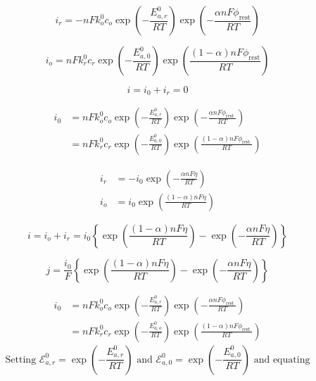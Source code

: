 \documentclass[lettersize,journal]{IEEEtran}
\begin{document}
\begin{equation}
i_{r}=-n F k_{o}^{0} c_{o} \exp \left(-\frac{E_{a, r}^{0}}{R T}\right) \exp \left(-\frac{\alpha n F \phi_{\mathrm{rest}}}{R T}\right)
\end{equation}

\begin{equation}
i_{o}=n F k_{r}^{0} c_{r} \exp \left(-\frac{E_{a, 0}^{0}}{R T}\right) \exp \left(\frac{(1-\alpha) n F \phi_{\mathrm{rest}}}{R T}\right)
\end{equation}

\begin{equation}
i=i_{0}+i_{r}=0
\end{equation}

\begin{equation}
\begin{aligned}
i_{0} &=n F k_{o}^{0} c_{o} \exp \left(-\frac{E_{a, r}^{0}}{R T}\right) \exp \left(-\frac{\alpha n F \phi_{\text {rest }}}{R T}\right) \\
&=n F k_{r}^{0} c_{r} \exp \left(-\frac{E_{a, 0}^{0}}{R T}\right) \exp \left(\frac{(1-\alpha) n F \phi_{\text {rest }}}{R T}\right)
\end{aligned}
\end{equation}

\begin{equation}
\begin{aligned}
i_{r} &=-i_{0} \exp \left(-\frac{\alpha n F \eta}{R T}\right) \\
i_{o} &=i_{0} \exp \left(\frac{(1-\alpha) n F \eta}{R T}\right)
\end{aligned}
\end{equation}

\begin{equation}
i=i_{o}+i_{r}=i_{0}\left\{\exp \left(\frac{(1-\alpha) n F \eta}{R T}\right)-\exp \left(-\frac{\alpha n F \eta}{R T}\right)\right\}
\end{equation}


\begin{equation}
j=\frac{i_{0}}{F}\left\{\exp \left(\frac{(1-\alpha) n F \eta}{R T}\right)-\exp \left(-\frac{\alpha n F \eta}{R T}\right)\right\}
\end{equation}

\begin{equation}
\begin{aligned}
i_{0} &=n F k_{o}^{0} c_{o} \exp \left(-\frac{E_{a, r}^{0}}{R T}\right) \exp \left(-\frac{\alpha n F \phi_{\text {rest }}}{R T}\right) \\
&=n F k_{r}^{0} c_{r} \exp \left(-\frac{E_{a, o}^{0}}{R T}\right) \exp \left(\frac{(1-\alpha) n F \phi_{\text {rest }}}{R T}\right)
\end{aligned}
\end{equation}
\begin{equation}
\text { Setting } \mathscr{E}_{a, r}^{0}=\exp \left(-\frac{E_{a, r}^{0}}{R T}\right) \text { and } \mathscr{E}_{a, 0}^{0}=\exp \left(-\frac{E_{a, 0}^{0}}{R T}\right) \text { and equating }
\end{equation}
\end{document}
